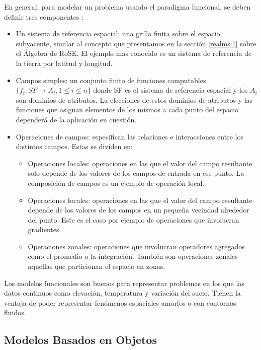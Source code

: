 En general, para modelar un problema usando el paradigma funcional, se deben definir tres componentes \cite{worboyz}:
\begin{itemize}
    \item Un sistema de referencia espacial: una grilla finita sobre el espacio subyacente,
    similar al concepto que presentamos en la sección \ref{realms:1} sobre el Álgebra de RoSE.
    El ejemplo mas conocido es un sistema de referencia de la tierra por latitud y longitud.
    \item Campos simples: un conjunto finito de funciones computables $\{f_i: SF \rightarrow A_i, 1 \le i \le n\}$
    donde SF es el sistema de referencia espacial y los $A_i$ son dominios de atributos. La elecciones de estos dominios de atributos
    y las funciones que asignan elementos de los mismos a cada punto del espacio dependerá de la aplicación en cuestión.
    \item Operaciones de campos: especifican las relaciones e interacciones entre los distintos campos. Estas se dividen en:
    \begin{itemize}
        \item Operaciones locales: operaciones en las que el valor del campo resultante solo depende de los valores de los campos de entrada en ese punto.
        La composición de campos es un ejemplo de operación local.
        \item Operaciones focales: operaciones en las que el valor del campo resultante depende de los valores de los campos en un pequeña vecindad alrededor del punto.
        Este es el caso por ejemplo de operaciones que involucran gradientes.
        \item Operaciones zonales: operaciones que involucran operadores agregados como el promedio o la integración. También son operaciones
        zonales aquellas que particionan el espacio en zonas.
    \end{itemize}
\end{itemize}

Los modelos funcionales son buenos para representar problemas en los que las datos continuos
como elevación, temperatura y variación del suelo.
Tienen la ventaja de poder representar fenómenos espaciales amorfos o con contornos fluidos.

\subsection{Modelos Basados en Objetos} \label{subsec:mbo}

